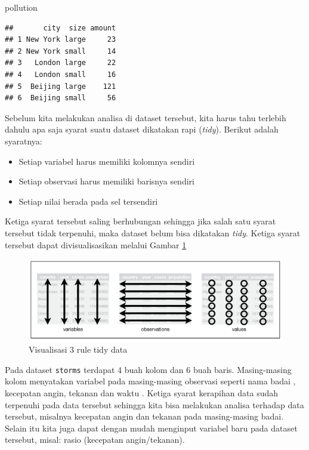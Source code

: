 \documentclass[]{book}
\newenvironment{Shaded}{\begin{snugshade}}{\end{snugshade}}
\newcommand{\NormalTok}[1]{#1}
\providecommand{\tightlist}{%
  \setlength{\itemsep}{0pt}\setlength{\parskip}{0pt}}
\begin{document}
\begin{Shaded}
\begin{Highlighting}[]
\NormalTok{pollution}
\end{Highlighting}
\end{Shaded}

\begin{verbatim}
##       city  size amount
## 1 New York large     23
## 2 New York small     14
## 3   London large     22
## 4   London small     16
## 5  Beijing large    121
## 6  Beijing small     56
\end{verbatim}

Sebelum kita melakukan analisa di dataset tersebut, kita harus tahu
terlebih dahulu apa saja syarat suatu dataset dikatakan rapi
(\emph{tidy}). Berikut adalah syaratnya:

\begin{itemize}
\tightlist
\item
  Setiap variabel harus memiliki kolomnya sendiri
\item
  Setiap observasi harus memiliki barisnya sendiri
\item
  Setiap nilai berada pada sel tersendiri
\end{itemize}

Ketiga syarat tersebut saling berhubungan sehingga jika salah satu
syarat tersebut tidak terpenuhi, maka dataset belum bisa dikatakan
\emph{tidy}. Ketiga syarat tersebut dapat divisualisasikan melalui
Gambar \ref{fig:tidy}

\begin{figure}

{\centering \includegraphics[width=8.14in]{tidy} 

}

\caption{Visualisasi 3 rule tidy data}\label{fig:tidy}
\end{figure}

Pada dataset \texttt{storms} terdapat 4 buah kolom dan 6 buah baris.
Masing-masing kolom menyatakan variabel pada masing-masing observasi
seperti nama badai , kecepatan angin, tekanan dan waktu . Ketiga syarat
kerapihan data sudah terpenuhi pada data tersebut sehingga kita bisa
melakukan analisa terhadap data tersebut, misalnya kecepatan angin dan
tekanan pada masing-masing badai. Selain itu kita juga dapat dengan
mudah menginput variabel baru pada dataset tersebut, misal: rasio
(kecepatan angin/tekanan).
\end{document}
